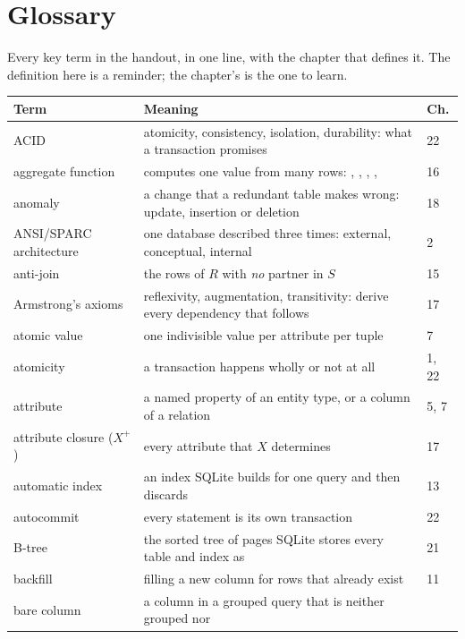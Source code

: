 \chapter{Glossary}\label{app:glossary}
\normalfigures

Every key term in the handout, in one line, with the chapter that defines it.
The definition here is a reminder; the chapter's is the one to learn.

\begin{longtable}{@{}L{3.9cm}L{8.9cm}R{1.2cm}@{}}
\toprule
{}
\textbf{Term} & \textbf{Meaning} & \textbf{Ch.} \\
\midrule
\endhead
ACID & atomicity, consistency, isolation, durability: what a transaction
  promises & 22 \\
aggregate function & computes one value from many rows: ,
  , , ,  & 16 \\
anomaly & a change that a redundant table makes wrong: update, insertion or
  deletion & 18 \\
ANSI/SPARC architecture & one database described three times: external,
  conceptual, internal & 2 \\
anti-join & the rows of $R$ with \emph{no} partner in $S$ & 15 \\
Armstrong's axioms & reflexivity, augmentation, transitivity: derive every
  dependency that follows & 17 \\
atomic value & one indivisible value per attribute per tuple & 7 \\
atomicity & a transaction happens wholly or not at all & 1, 22 \\
attribute & a named property of an entity type, or a column of a relation & 5,
  7 \\
attribute closure ($X^{+}$) & every attribute that $X$ determines & 17 \\
automatic index & an index SQLite builds for one query and then discards & 13 \\
autocommit & every statement is its own transaction & 22 \\
B-tree & the sorted tree of pages SQLite stores every table and index as & 21 \\
backfill & filling a new column for rows that already exist & 11 \\
bare column & a column in a grouped query that is neither grouped nor

\end{longtable}
